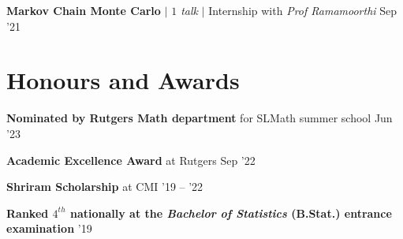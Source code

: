 \resumeProjectHeading
{\textbf{Markov Chain Monte Carlo} $|$ \emph{$1$ talk} $|$ Internship with \textit{Prof Ramamoorthi}}
{Sep '21}
{}
%
%
%
%
\resumeSubHeadingListEnd

\vspace{-20pt}




\section{Honours and Awards}
\resumeSubHeadingListStart

\resumeProjectHeading
{\textbf{Nominated by Rutgers Math department} for SLMath summer school}
{Jun '23}
{\resumeItemListStart
{}
\resumeItemListEnd}
\vspace{\gap}

\resumeProjectHeading
{\textbf{Academic Excellence Award} at Rutgers}
{Sep '22}
{\resumeItemListStart
{}
\resumeItemListEnd}
\vspace{\gap}

\resumeProjectHeading
{\textbf{Shriram Scholarship} at CMI}
{'19 -- '22}
{\resumeItemListStart
{}
\resumeItemListEnd}
\vspace{\gap}

\resumeProjectHeading
{\textbf{Ranked $4^{th}$ nationally at the  \emph{Bachelor of Statistics} (B.Stat.) entrance examination}}
{'19}
{\resumeItemListStart
{}
\resumeItemListEnd}
\vspace{\gap}

